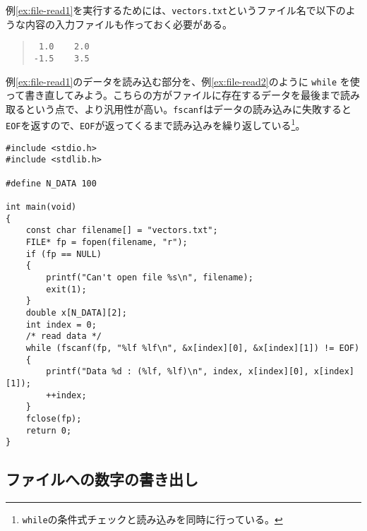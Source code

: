 例\ref{ex:file-read1}を実行するためには、\texttt{vectors.txt}というファイル名で以下のような内容の入力ファイルも作っておく必要がある。
\begin{quote}
    \begin{verbatim}
 1.0    2.0
-1.5    3.5
\end{verbatim}
\end{quote}
例\ref{ex:file-read1}のデータを読み込む部分を、例\ref{ex:file-read2}のように \texttt{while} を使って書き直してみよう。こちらの方がファイルに存在するデータを最後まで読み取るという点で、より汎用性が高い。\texttt{fscanf}はデータの読み込みに失敗すると\texttt{EOF}を返すので、\texttt{EOF}が返ってくるまで読み込みを繰り返している\footnote{\texttt{while}の条件式チェックと読み込みを同時に行っている。}。
\begin{reidai}\label{ex:file-read2}
    \begin{verbatim}
#include <stdio.h>
#include <stdlib.h>

#define N_DATA 100

int main(void)
{
    const char filename[] = "vectors.txt";
    FILE* fp = fopen(filename, "r");
    if (fp == NULL)
    {
        printf("Can't open file %s\n", filename);
        exit(1);
    }
    double x[N_DATA][2];
    int index = 0;
    /* read data */
    while (fscanf(fp, "%lf %lf\n", &x[index][0], &x[index][1]) != EOF)
    {
        printf("Data %d : (%lf, %lf)\n", index, x[index][0], x[index][1]);
        ++index;
    }
    fclose(fp);
    return 0;
}
\end{verbatim}
\end{reidai}

\subsection{ファイルへの数字の書き出し}


